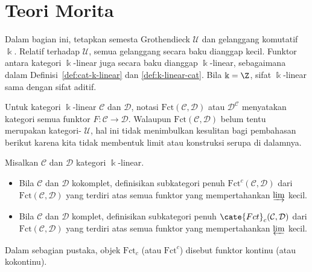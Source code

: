 
\section{Teori Morita}\label{sec:Morita}
\hypertarget{o014.aljabr2.chapter7.morita-theory-a}{ }
Dalam bagian ini, tetapkan semesta Grothendieck $\mathcal{U}$ dan gelanggang
komutatif $\Bbbk$. Relatif terhadap $\mathcal{U}$, semua gelanggang secara
baku dianggap kecil. Funktor antara kategori $\Bbbk$-linear juga secara baku
dianggap $\Bbbk$-linear, sebagaimana dalam
Definisi~\ref{def:cat-k-linear} dan \ref{def:k-linear-cat}. Bila
$\Bbbk=\Z$, sifat $\Bbbk$-linear sama dengan sifat aditif.

Untuk kategori $\Bbbk$-linear $\mathcal{C}$ dan $\mathcal{D}$, notasi
$\mathrm{Fct}(\mathcal{C},\mathcal{D})$ atau
$\mathcal{D}^{\mathcal{C}}$ menyatakan kategori semua funktor
$F:\mathcal{C}\to\mathcal{D}$. Walaupun
$\mathrm{Fct}(\mathcal{C},\mathcal{D})$ belum tentu merupakan kategori-
$\mathcal{U}$, hal ini tidak menimbulkan kesulitan bagi pembahasan berikut
karena kita tidak membentuk limit atau konstruksi serupa di dalamnya.

\begin{definition}
	Misalkan $\mathcal{C}$ dan $\mathcal{D}$ kategori $\Bbbk$-linear.
	\begin{itemize}
		\item Bila $\mathcal{C}$ dan $\mathcal{D}$ kokomplet, definisikan
		subkategori penuh $\mathrm{Fct}^c(\mathcal{C},\mathcal{D})$ dari
		$\mathrm{Fct}(\mathcal{C},\mathcal{D})$ yang terdiri atas semua funktor
		yang mempertahankan $\varinjlim$ kecil.
		\item Bila $\mathcal{C}$ dan $\mathcal{D}$ komplet, definisikan
		subkategori penuh $\cate{Fct}_c(\mathcal{C},\mathcal{D})$ dari
		$\mathrm{Fct}(\mathcal{C},\mathcal{D})$ yang terdiri atas semua funktor
		yang mempertahankan $\varprojlim$ kecil.
	\end{itemize}
	Dalam sebagian pustaka, objek $\mathrm{Fct}_c$ (atau
	$\mathrm{Fct}^c$) disebut funktor kontinu (atau kokontinu).
\end{definition}

